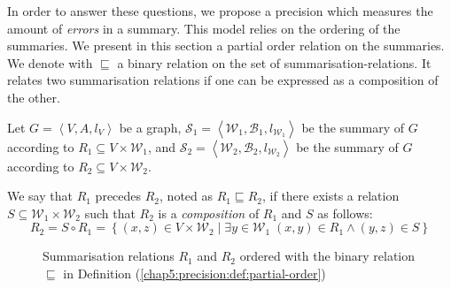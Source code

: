 In order to answer these questions, we propose a \gls{precision} which measures the amount of \emph{errors} in a summary. This model relies on the ordering of the summaries. We present in this section a partial order relation on the summaries.\\


We denote with $\sqsubseteq$ a binary relation on the set of \glspl{summarisation-relation}. It relates two summarisation relations if one can be expressed as a composition of the other.

\begin{definition}
	Let $G=\left\langle V, A, l_V \right\rangle$ be a graph, $\mathcal{S}_1 = \left\langle \mathcal{W}_1, \mathcal{B}_1, l_{\mathcal{W}_1} \right\rangle$ be the summary of $G$ according to $R_1 \subseteq V \times \mathcal{W}_1$, and $\mathcal{S}_2 = \left\langle \mathcal{W}_2, \mathcal{B}_2, l_{\mathcal{W}_2} \right\rangle$ be the summary of $G$ according to $R_2 \subseteq V \times \mathcal{W}_2$.

	We say that $R_1$ precedes $R_2$, noted as $R_1 \sqsubseteq R_2$, if there exists a relation $S \subseteq \mathcal{W}_1 \times \mathcal{W}_2$ such that $R_2$ is a \emph{composition} of $R_1$ and $S$ as follows:
	$$
	R_2 = S \circ R_1 = \left\lbrace (x, z) \in V \times \mathcal{W}_2 \mid \exists y \in \mathcal{W}_1\; (x, y) \in R_1 \wedge (y, z) \in S \right\rbrace
	$$
	\label{chap5:precision:def:partial-order}
\end{definition}

\begin{figure}
	\centering
	\resizebox{.6\textwidth}{!}{
		
	}
	\caption{Summarisation relations $R_1$ and $R_2$ ordered with the binary relation $\sqsubseteq$ in Definition (\ref{chap5:precision:def:partial-order})}
	\label{fig:partial-order}
\end{figure}

